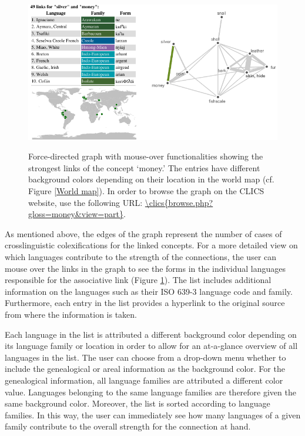\begin{figure}[htbp]
\begin{center}
    \href{\clics{browse.php?gloss=money&view=part}}{\includegraphics[width=\textwidth]{img/silver-image.pdf}}
\caption{Force-directed graph with mouse-over functionalities showing the strongest links of the
concept `{money}.' The entries have different background colors depending on their location in the
world map (cf. Figure \ref{World map}). In order to browse the graph on the CLICS website, use the
following URL: \url{\clics{browse.php?gloss=money&view=part}}.}
\label{MoneySilver}
\end{center}
\end{figure}




As mentioned above, the edges of the graph represent the number of cases of crosslinguistic colexifications for the linked concepts. For a more detailed view on which languages contribute to the strength of the connections, the user can mouse over the links in the graph to see the forms in the individual languages responsible for the associative link (Figure \ref{MoneySilver}). The list includes additional information on the languages such as their ISO 639-3 language code and family. Furthermore, each entry in the list provides a hyperlink to the original source from where the information is taken.  


Each language in the list is attributed a different background color depending on its language family or location in order to allow for an at-a-glance overview of all languages in the list. The user can choose from a drop-down menu whether to include the genealogical or areal information as the background color. For the genealogical information, all language families are attributed a different color value. Languages belonging to the same language families are therefore given the same background color. Moreover, the list is sorted according to language families. In this way, the user can immediately see how many languages of  a given family contribute to the overall strength for the connection at hand. 

